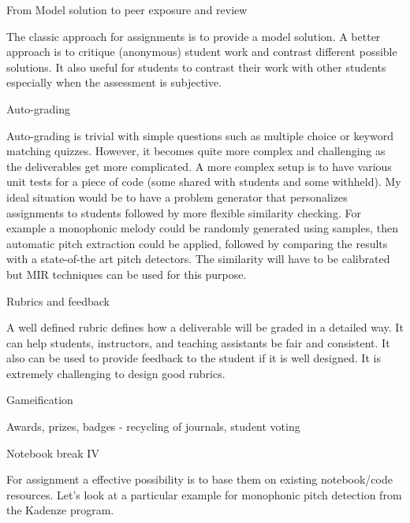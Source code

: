 \documentclass[12pt]{beamer}
\begin{document}
\begin{frame}{From Model solution to peer exposure and review}

  The classic approach for assignments is to provide a model solution.
  A better approach is to critique (anonymous) student work and contrast
  different possible solutions. It also useful for students to contrast
  their work with other students especially when the assessment is subjective.
\end{frame}

\begin{frame}{Auto-grading}

  Auto-grading is trivial with simple questions such as multiple choice
  or keyword matching quizzes. However, it becomes quite more complex
  and challenging as the deliverables get more complicated. A more
  complex setup is to have various unit tests for a piece of code
  (some shared with students and some withheld). My ideal situation
  would be to have a problem generator that personalizes assignments
  to students followed by more flexible similarity checking. For example
  a monophonic melody could be randomly generated using samples, then
  automatic pitch extraction could be applied, followed by comparing the
  results with a state-of-the art pitch detectors. The similarity will
  have to be calibrated but MIR techniques can be used for this purpose. 
  
\end{frame}

\begin{frame}{Rubrics and feedback}

A well defined rubric defines how a deliverable will be graded in a
detailed way. It can help students, instructors, and teaching assistants
be fair and consistent. It also can be used to provide feedback to the student
if it is well designed. It is extremely challenging to design good rubrics.  
  
\end{frame}

\begin{frame}{Gameification}

  Awards, prizes, badges - recycling of journals, student voting 
  
\end{frame}




\begin{frame}{Notebook break IV}

  For assignment a effective possibility is to base them on existing
  notebook/code resources. Let's look at a particular example for
  monophonic pitch detection from the Kadenze program. 
  
\end{frame}
\end{document}
